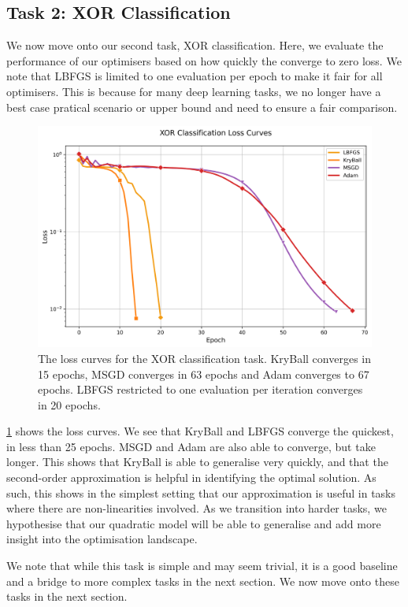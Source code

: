 \subsection{Task 2: XOR Classification}
\label{ssec:results_xor_classification}

We now move onto our second task, XOR classification. Here, we evaluate the performance of our optimisers based on how quickly the converge to zero loss. We note that LBFGS is limited to one evaluation per epoch to make it fair for all optimisers. This is because for many deep learning tasks, we no longer have a best case pratical scenario or upper bound and need to ensure a fair comparison.

\begin{figure}[!t]
    \centering
    \includegraphics[width=0.6\linewidth]{figures/5evals/xor_losses.png}
    \caption{The loss curves for the XOR classification task. KryBall converges in 15 epochs, MSGD converges in 63 epochs and Adam converges to 67 epochs. LBFGS restricted to one evaluation per iteration converges in 20 epochs.}
    \label{fig:xor_results}
\end{figure}

\cref{fig:xor_results} shows the loss curves. We see that KryBall and LBFGS converge the quickest, in less than 25 epochs. MSGD and Adam are also able to converge, but take longer. This shows that KryBall is able to generalise very quickly, and that the second-order approximation is helpful in identifying the optimal solution. As such, this shows in the simplest setting that our approximation is useful in tasks where there are non-linearities involved. As we transition into harder tasks, we hypothesise that our quadratic model will be able to generalise and add more insight into the optimisation landscape.

We note that while this task is simple and may seem trivial, it is a good baseline and a bridge to more complex tasks in the next section. We now move onto these tasks in the next section.

